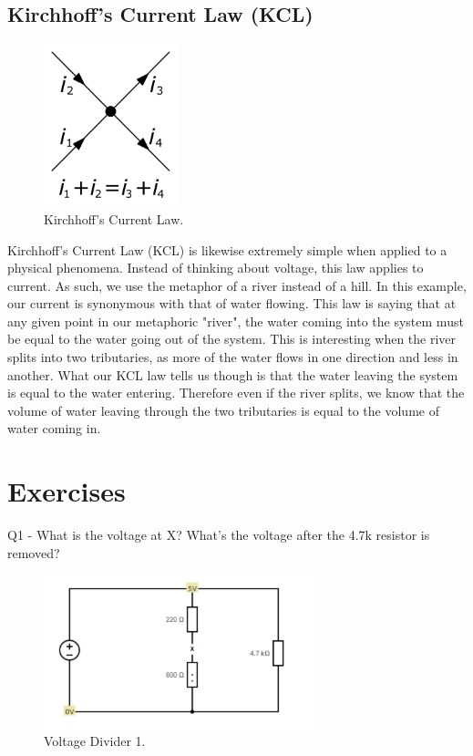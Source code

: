 \documentclass[a4paper]{article}
\begin{document}
\subsection{Kirchhoff's Current Law (KCL)}

\begin{figure}
  \begin{center}
    \includegraphics[width=0.35\textwidth]{kcl.png}
  \end{center}
  \caption{\label{fig:kvl}Kirchhoff’s Current Law.}
\end{figure}

Kirchhoff's Current Law (KCL) is likewise extremely simple when applied to a physical phenomena. Instead of thinking about voltage, this law applies to current. As such, we use the metaphor of a river instead of a hill. In this example, our current is synonymous with that of water flowing. This law is saying that at any given point in our metaphoric "river", the water coming into the system must be equal to the water going out of the system. This is interesting when the river splits into two tributaries, as more of the water flows in one direction and less in another. What our KCL law tells us though is that the water leaving the system is equal to the water entering. Therefore even if the river splits, we know that the volume of water leaving through the two tributaries is equal to the volume of water coming in.

\vspace{4cm}
\noindent

\newpage
\section{Exercises}
Q1 - What is the voltage at X? What's the voltage after the 4.7k resistor is removed?

\begin{figure}[h!]
\centering
\includegraphics[width=0.7\textwidth]{q1.jpg}
\caption{\label{fig:data}Voltage Divider 1.}
\end{figure}
\end{document}
